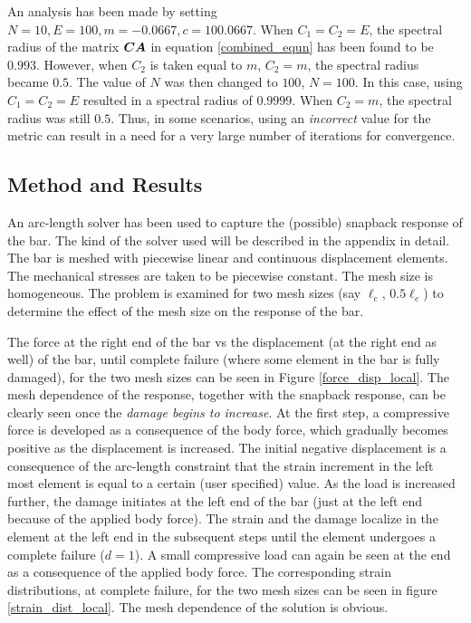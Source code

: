 \documentclass[12pt]{elsarticle}
\begin{document}
An analysis has been made by setting $N=10, E=100, m=-0.0667, c=100.0667$. When $C_1=C_2=E$, the spectral radius of the matrix $\mbox{\boldmath $C$} \mbox{\boldmath $A$} $ in equation \ref{combined_equn} has been found to be $0.993$. However, when $C_2$ is taken equal to $m$, $C_2=m$, the spectral radius became $0.5$. The value of $N$ was then changed to $100$, $N=100$. In this case, using $C_1=C_2=E$ resulted in a spectral radius of $0.9999$. When $C_2=m$, the spectral radius was still $0.5$. Thus, in some scenarios, using an \textit{incorrect} value for the metric can result in a need for a very large number of iterations for convergence.


\subsection{Method and Results}

An arc-length solver has been used to capture the (possible) snapback response of the bar. The kind of the solver used will be described in the appendix in detail. The bar is meshed with piecewise linear and continuous displacement elements. The mechanical stresses are taken to be piecewise constant. The mesh size is homogeneous. The problem is examined for two mesh sizes (say $\ell_e$, $0.5 \ell_e$) to determine the effect of the mesh size on the response of the bar.

The force at the right end of the bar vs the displacement (at the right end as well) of the bar, until complete failure (where some element in the bar is fully damaged), for the two mesh sizes can be seen in Figure \ref{force_disp_local}. The mesh dependence of the response, together with the snapback response, can be clearly seen once the \textit{damage begins to increase}. At the first step, a compressive force is developed as a consequence of the body force, which gradually becomes positive as the displacement is increased. The initial negative displacement is a consequence of the arc-length constraint that the strain increment in the left most element is equal to a certain (user specified) value. As the load is increased further, the damage initiates at the left end of the bar (just at the left end because of the applied body force). The strain and the damage localize in the element at the left end in the subsequent steps until the element undergoes a complete failure ($d=1$). A small compressive load can again be seen at the end as a consequence of the applied body force. The corresponding strain distributions, at complete failure, for the two mesh sizes can be seen in figure \ref{strain_dist_local}. The mesh dependence of the solution is obvious.
\end{document}
